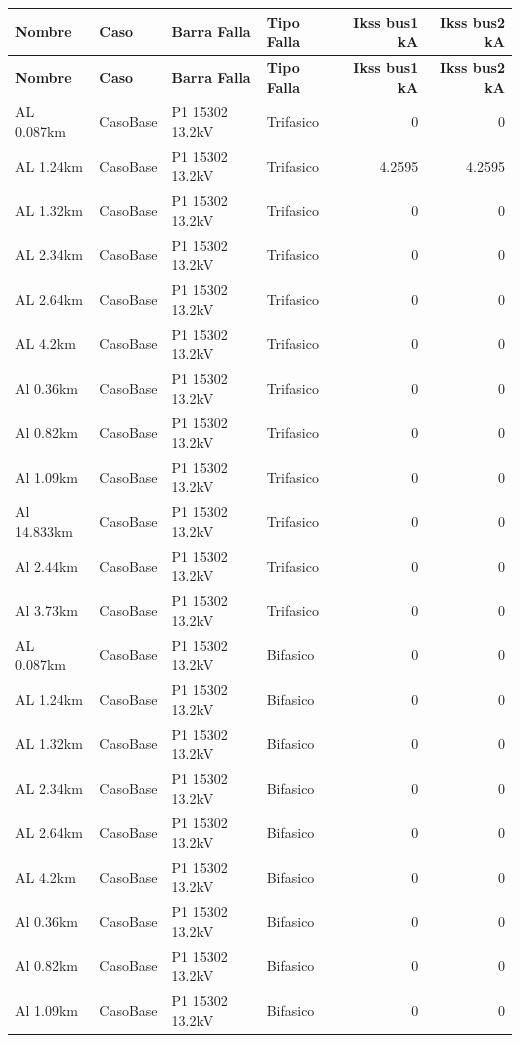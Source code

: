 \documentclass[11pt,a4paper]{article}
\begin{document}
\small
\begin{longtable}{llllrr}
\toprule
\textbf{Nombre} & \textbf{Caso} & \textbf{Barra Falla} & \textbf{Tipo Falla} & \textbf{Ikss bus1 kA} & \textbf{Ikss bus2 kA} \\
\midrule
\endfirsthead
\toprule
\textbf{Nombre} & \textbf{Caso} & \textbf{Barra Falla} & \textbf{Tipo Falla} & \textbf{Ikss bus1 kA} & \textbf{Ikss bus2 kA} \\
\midrule
\endhead
\bottomrule
\endfoot
AL 0.087km & CasoBase & P1 15302 13.2kV & Trifasico & 0 & 0 \\
AL 1.24km & CasoBase & P1 15302 13.2kV & Trifasico & 4.2595 & 4.2595 \\
AL 1.32km & CasoBase & P1 15302 13.2kV & Trifasico & 0 & 0 \\
AL 2.34km & CasoBase & P1 15302 13.2kV & Trifasico & 0 & 0 \\
AL 2.64km & CasoBase & P1 15302 13.2kV & Trifasico & 0 & 0 \\
AL 4.2km & CasoBase & P1 15302 13.2kV & Trifasico & 0 & 0 \\
Al 0.36km & CasoBase & P1 15302 13.2kV & Trifasico & 0 & 0 \\
Al 0.82km & CasoBase & P1 15302 13.2kV & Trifasico & 0 & 0 \\
Al 1.09km & CasoBase & P1 15302 13.2kV & Trifasico & 0 & 0 \\
Al 14.833km & CasoBase & P1 15302 13.2kV & Trifasico & 0 & 0 \\
Al 2.44km & CasoBase & P1 15302 13.2kV & Trifasico & 0 & 0 \\
Al 3.73km & CasoBase & P1 15302 13.2kV & Trifasico & 0 & 0 \\
AL 0.087km & CasoBase & P1 15302 13.2kV & Bifasico & 0 & 0 \\
AL 1.24km & CasoBase & P1 15302 13.2kV & Bifasico & 0 & 0 \\
AL 1.32km & CasoBase & P1 15302 13.2kV & Bifasico & 0 & 0 \\
AL 2.34km & CasoBase & P1 15302 13.2kV & Bifasico & 0 & 0 \\
AL 2.64km & CasoBase & P1 15302 13.2kV & Bifasico & 0 & 0 \\
AL 4.2km & CasoBase & P1 15302 13.2kV & Bifasico & 0 & 0 \\
Al 0.36km & CasoBase & P1 15302 13.2kV & Bifasico & 0 & 0 \\
Al 0.82km & CasoBase & P1 15302 13.2kV & Bifasico & 0 & 0 \\
Al 1.09km & CasoBase & P1 15302 13.2kV & Bifasico & 0 & 0 \\

\end{longtable}
\end{document}
